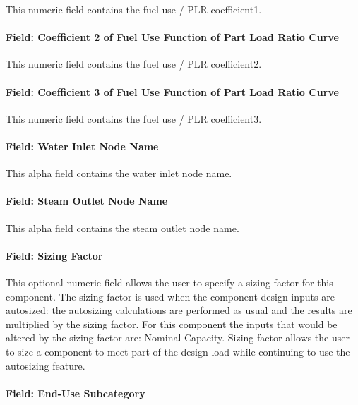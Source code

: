 This numeric field contains the fuel use / PLR coefficient1.

\paragraph{Field: Coefficient 2 of Fuel Use Function of Part Load Ratio Curve}\label{field-coefficient-2-of-fuel-use-function-of-part-load-ratio-curve}

This numeric field contains the fuel use / PLR coefficient2.

\paragraph{Field: Coefficient 3 of Fuel Use Function of Part Load Ratio Curve}\label{field-coefficient-3-of-fuel-use-function-of-part-load-ratio-curve}

This numeric field contains the fuel use / PLR coefficient3.

\paragraph{Field: Water Inlet Node Name}\label{field-water-inlet-node-name-001}

This alpha field contains the water inlet node name.

\paragraph{Field: Steam Outlet Node Name}\label{field-steam-outlet-node-name}

This alpha field contains the steam outlet node name.

\paragraph{Field: Sizing Factor}\label{field-sizing-factor-11}

This optional numeric field allows the user to specify a sizing factor for this component. The sizing factor is used when the component design inputs are autosized: the autosizing calculations are performed as usual and the results are multiplied by the sizing factor. For this component the inputs that would be altered by the sizing factor are: Nominal Capacity. Sizing factor allows the user to size a component to meet part of the design load while continuing to use the autosizing feature.

\paragraph{Field: End-Use Subcategory}\label{end-use-subcategory-11}

